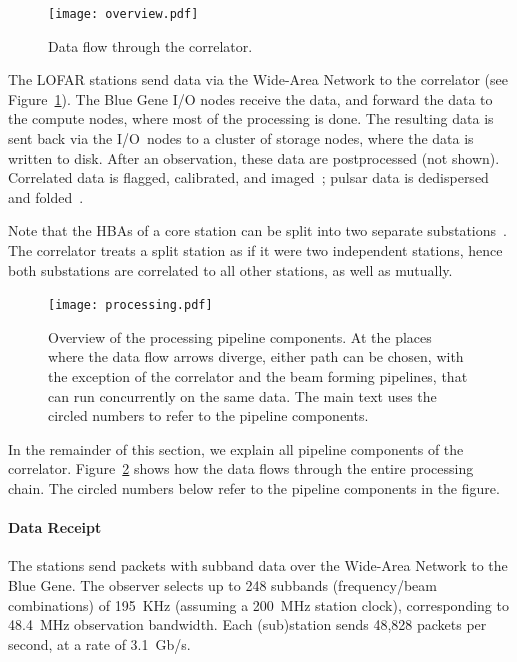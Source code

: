 \begin{figure}
\vspace{-9mm}
\begin{center}
\texttt{[image: overview.pdf]}
\end{center}
\caption{Data flow through the correlator.}
\label{fig:overview}
\end{figure}
The LOFAR stations send data via the Wide-Area Network to the correlator
(see Figure~\ref{fig:overview}).
The Blue Gene I/O nodes receive the data, and forward the data to the
compute nodes, where most of the processing is done.
The resulting data is sent back via the I/O~nodes to a cluster of storage
nodes, where the data is written to disk.
After an observation, these data are postprocessed (not shown).
Correlated data is flagged, calibrated, and imaged~\cite{Nijboer:10};
pulsar data is dedispersed and folded~\cite{Hessels:10}.

Note that the HBAs of a core station can be split into two separate
substations~\cite{?}.
The correlator treats a split station as if it were two independent stations,
hence both substations are correlated to all other stations, as well as
mutually.

\begin{figure}
\begin{center}
\texttt{[image: processing.pdf]}
\end{center}
\caption{Overview of the processing pipeline components.
At the places where the data flow arrows diverge, either path can be chosen,
with the exception of the correlator and the beam forming pipelines, that can
run concurrently on the same data.
The main text uses the circled numbers to refer to the pipeline components.
}
\label{fig:processing}
\end{figure}

In the remainder of this section, we explain all pipeline components of
the correlator.
Figure~\ref{fig:processing} shows how the data flows through the entire
processing chain.
The circled numbers below refer to the pipeline components in the figure.


\paragraph{Data Receipt }
The stations send packets with subband data over the Wide-Area Network to the
Blue Gene.
The observer selects up to 248 subbands (frequency/beam combinations) of
195~KHz (assuming a 200~MHz station clock), corresponding to 48.4~MHz
observation bandwidth.
Each (sub)station sends 48,828 packets per second, at a rate of 3.1~Gb/s.


